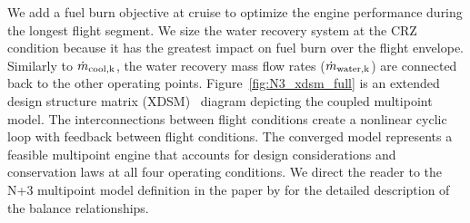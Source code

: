 \documentclass[conf]{new-aiaa}
\begin{document}
We add a fuel burn objective at cruise to optimize the engine performance during the longest flight segment.
We size the water recovery system at the CRZ condition because it has the greatest impact on fuel burn over the flight envelope.
Similarly to $\dot{m}_{\rm{cool},k}$, the water recovery mass flow rates ($\dot{m}_{\rm{water},k}$) are connected back to the other operating points.
Figure~\ref{fig:N3_xdsm_full} is an extended design structure matrix (XDSM)~\cite{Lambe2012a} diagram depicting the coupled multipoint model.
The interconnections between flight conditions create a nonlinear cyclic loop with feedback between flight conditions.
The converged model represents a feasible multipoint engine that accounts for design considerations and conservation laws at all four operating conditions.
We direct the reader to the N+3 multipoint model definition in the paper by \citet{Hendricks2019} for the detailed description of the balance relationships.
\end{document}
